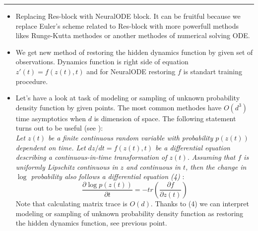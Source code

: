 \documentclass[a0]{a0poster}
\def\Head#1{\noindent{\LARGE\color{bluegray} #1}\bigskip}
\begin{document}
\begin{textblock}{7.0}
\medskip
\hrule\medskip
\Head{Possible applications}
\begin{itemize}\itemsep=12pt
\item Replacing  Res-block with NeuralODE block. It can be fruitful because we replace Euler's scheme related to Res-block with more powerfull methods likes Runge-Kutta methodes or another methodes of  numerical solving ODE.   
\item  We get new method of restoring the hidden dynamics function by given set of observations. Dynamics function is right side of equation $z'(t) = f(z(t),t)$ and for NeuralODE restoring $f$ is standart training procedure.   
\item Let's have a look at task of modeling or sampling of unknown probability density function by given points. The most common methodes have $O(d^3)$  time asymptotics when $d$ is dimension of space. The following statement turns out to be useful (see \cite{NeuralODE} ): \\
\hspace{1.25 cm} \textit{Let $z(t)$ be a finite continuous random variable with probability $p(z(t))$ dependent on time. Let $ dz / dt = f(z(t), t)$ be a differential equation describing a continuous-in-time transformation of $z(t)$. Assuming that $f$ is uniformly Lipschitz continuous in $z$ and continuous in $t$, then the change in $\log$ probability also follows a differential equation (4) }:
\begin{equation}
 \frac{\partial \log p \left( z(t) \right) }{\partial t } = -tr \left( \frac{\partial f }{ \partial z(t) }   \right)
 \end{equation} 
Note that calculating matrix trace is $O(d)$. Thanks to (4) we can interpret  modeling or sampling of unknown probability density function as restoring the hidden dynamics function, see previous point.
\end{itemize}

\end{textblock}
\end{document}
